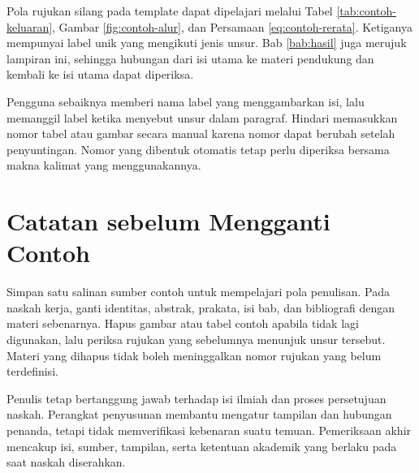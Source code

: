 Pola rujukan silang pada template dapat dipelajari melalui Tabel \ref{tab:contoh-keluaran}, Gambar \ref{fig:contoh-alur}, dan Persamaan \ref{eq:contoh-rerata}. Ketiganya mempunyai label unik yang mengikuti jenis unsur. Bab \ref{bab:hasil} juga merujuk lampiran ini, sehingga hubungan dari isi utama ke materi pendukung dan kembali ke isi utama dapat diperiksa.

Pengguna sebaiknya memberi nama label yang menggambarkan isi, lalu memanggil label ketika menyebut unsur dalam paragraf. Hindari memasukkan nomor tabel atau gambar secara manual karena nomor dapat berubah setelah penyuntingan. Nomor yang dibentuk otomatis tetap perlu diperiksa bersama makna kalimat yang menggunakannya.

\section*{Catatan sebelum Mengganti Contoh}

Simpan satu salinan sumber contoh untuk mempelajari pola penulisan. Pada naskah kerja, ganti identitas, abstrak, prakata, isi bab, dan bibliografi dengan materi sebenarnya. Hapus gambar atau tabel contoh apabila tidak lagi digunakan, lalu periksa rujukan yang sebelumnya menunjuk unsur tersebut. Materi yang dihapus tidak boleh meninggalkan nomor rujukan yang belum terdefinisi.

Penulis tetap bertanggung jawab terhadap isi ilmiah dan proses persetujuan naskah. Perangkat penyusunan membantu mengatur tampilan dan hubungan penanda, tetapi tidak memverifikasi kebenaran suatu temuan. Pemeriksaan akhir mencakup isi, sumber, tampilan, serta ketentuan akademik yang berlaku pada saat naskah diserahkan.
